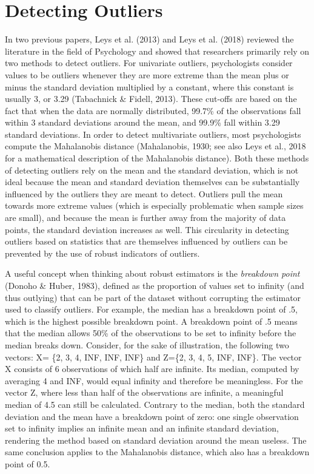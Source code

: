 \documentclass[man,floatsintext]{apa6}
\begin{document}
\hypertarget{detecting-outliers}{%
\section{Detecting Outliers}\label{detecting-outliers}}

In two previous papers, Leys et al. (2013) and Leys et al. (2018) reviewed the literature in the field of Psychology and showed that researchers primarily rely on two methods to detect outliers. For univariate outliers, psychologists consider values to be outliers whenever they are more extreme than the mean plus or minus the standard deviation multiplied by a constant, where this constant is usually 3, or 3.29 (Tabachnick \& Fidell, 2013). These cut-offs are based on the fact that when the data are normally distributed, 99.7\% of the observations fall within 3 standard deviations around the mean, and 99.9\% fall within 3.29 standard deviations. In order to detect multivariate outliers, most psychologists compute the Mahalanobis distance (Mahalanobis, 1930; see also Leys et al., 2018 for a mathematical description of the Mahalanobis distance). Both these methods of detecting outliers rely on the mean and the standard deviation, which is not ideal because the mean and standard deviation themselves can be substantially influenced by the outliers they are meant to detect. Outliers pull the mean towards more extreme values (which is especially problematic when sample sizes are small), and because the mean is further away from the majority of data points, the standard deviation increases as well. This circularity in detecting outliers based on statistics that are themselves influenced by outliers can be prevented by the use of robust indicators of outliers.

A useful concept when thinking about robust estimators is the \emph{breakdown point} (Donoho \& Huber, 1983), defined as the proportion of values set to infinity (and thus outlying) that can be part of the dataset without corrupting the estimator used to classify outliers. For example, the median has a breakdown point of .5, which is the highest possible breakdown point. A breakdown point of .5 means that the median allows 50\% of the observations to be set to infinity before the median breaks down. Consider, for the sake of illustration, the following two vectors: X= \{2, 3, 4, INF, INF, INF\} and Z=\{2, 3, 4, 5, INF, INF\}. The vector X consists of 6 observations of which half are infinite. Its median, computed by averaging 4 and INF, would equal infinity and therefore be meaningless. For the vector Z, where less than half of the observations are infinite, a meaningful median of 4.5 can still be calculated. Contrary to the median, both the standard deviation and the mean have a breakdown point of zero: one single observation set to infinity implies an infinite mean and an infinite standard deviation, rendering the method based on standard deviation around the mean useless. The same conclusion applies to the Mahalanobis distance, which also has a breakdown point of 0.5.
\end{document}
